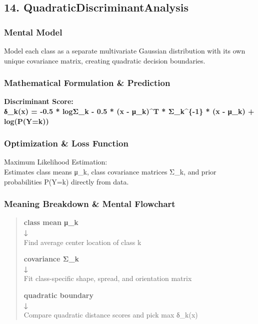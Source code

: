 \documentclass[
  10pt,
  letterpaper,
]{article}
\begin{document}
\hypertarget{quadraticdiscriminantanalysis}{%
\subsection{14. QuadraticDiscriminantAnalysis}\label{quadraticdiscriminantanalysis}}

\hypertarget{mental-model-13}{%
\subsubsection{Mental Model}\label{mental-model-13}}

Model each class as a separate multivariate Gaussian distribution with its own unique covariance matrix, creating quadratic decision boundaries.

\hypertarget{mathematical-formulation-prediction-13}{%
\subsubsection{Mathematical Formulation \& Prediction}\label{mathematical-formulation-prediction-13}}

\textbf{Discriminant Score:\\
δ\_k(x) = -0.5 * log\textbar Σ\_k\textbar{} - 0.5 * (x - μ\_k)\^{}T * Σ\_k\^{}\{-1\} * (x - μ\_k) + log(P(Y=k))}

\hypertarget{optimization-loss-function-13}{%
\subsubsection{Optimization \& Loss Function}\label{optimization-loss-function-13}}

Maximum Likelihood Estimation:\\
Estimates class means μ\_k, class covariance matrices Σ\_k, and prior probabilities P(Y=k) directly from data.

\hypertarget{meaning-breakdown-mental-flowchart-13}{%
\subsubsection{Meaning Breakdown \& Mental Flowchart}\label{meaning-breakdown-mental-flowchart-13}}

\begin{quote}
\textbf{class mean μ\_k\\
↓\\
}Find average center location of class k

\textbf{covariance Σ\_k\\
↓\\
}Fit class-specific shape, spread, and orientation matrix

\textbf{quadratic boundary\\
↓\\
}Compare quadratic distance scores and pick max δ\_k(x)
\end{quote}
\end{document}
